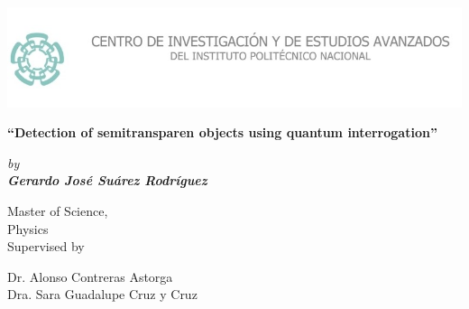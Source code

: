 \documentclass[12pt]{book}
\begin{document}
\newcommand\numberthis{\addtocounter{equation}{1}\tag{\theequation}}

\raggedbottom


\thispagestyle{empty}
\setlength\headheight{0pt} 
\begin{center}

\begin{center}
\includegraphics[width=1\linewidth]{images/logo.jpg}            
\end{center}    

  \vspace{3 cm}

        {\Large\bfseries  ``Detection of semitransparen objects using quantum interrogation''\par}

        \vspace{0.5cm}
        {\Large\itshape by \\ \bfseries Gerardo José Suárez Rodríguez \par \par}
        

\vspace{2cm}


Master of Science, \\ Physics\\
Supervised by\par
Dr. Alonso Contreras Astorga  \\
Dra. Sara Guadalupe Cruz y Cruz\\




\end{center}

\clearpage

\tableofcontents
{}
\pagebreak
{}
\end{document}
